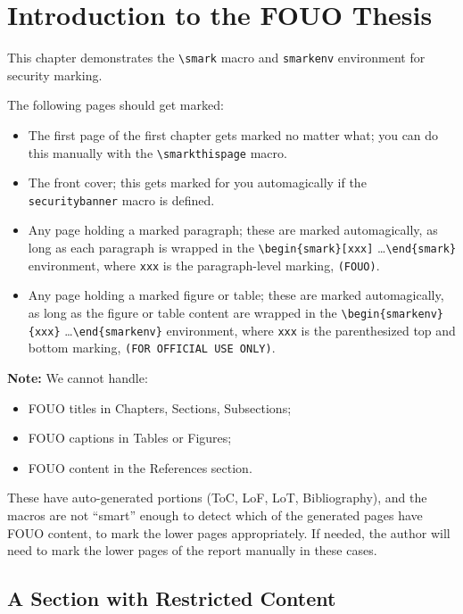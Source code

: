 \chapter{Introduction to the FOUO Thesis}

This chapter demonstrates the \verb|\smark| macro and
\verb|smarkenv| environment for security marking.

\smarkthispage

The following pages should get marked:
\begin{itemize}
\item The first page of the first chapter gets marked no matter what;
you can do this manually with the \verb|\smarkthispage| macro.
\item The front cover; this gets marked for you automagically if the
\verb|securitybanner| macro is defined.
\item Any page holding a marked paragraph; these are marked
automagically, as long as each paragraph is wrapped in the
\verb|\begin{smark}[xxx]| \ldots \verb|\end{smark}| environment,
where \verb|xxx| is the paragraph-level marking, \ie \verb|(FOUO)|.
\item Any page holding a marked figure or table; these are
marked automagically, as long as the figure or table content are
wrapped in the \verb|\begin{smarkenv}{xxx}| \ldots \verb|\end{smarkenv}|
environment, where \verb|xxx| is the parenthesized top and bottom
marking, \ie \verb|(FOR OFFICIAL USE ONLY)|.
\end{itemize}

\textbf{Note:} We cannot handle:
\begin{itemize}
\item FOUO titles in Chapters, Sections, Subsections;
\item FOUO captions in Tables or Figures;
\item FOUO content in the References section.
\end{itemize}
These have auto-generated portions (ToC, LoF, LoT, Bibliography),
and the macros are not ``smart'' enough to detect which of the
generated pages have FOUO content, to mark the lower pages
appropriately. If needed, the author will need to mark the lower
pages of the report manually in these cases.

\newpage
\section{A Section with Restricted Content}

